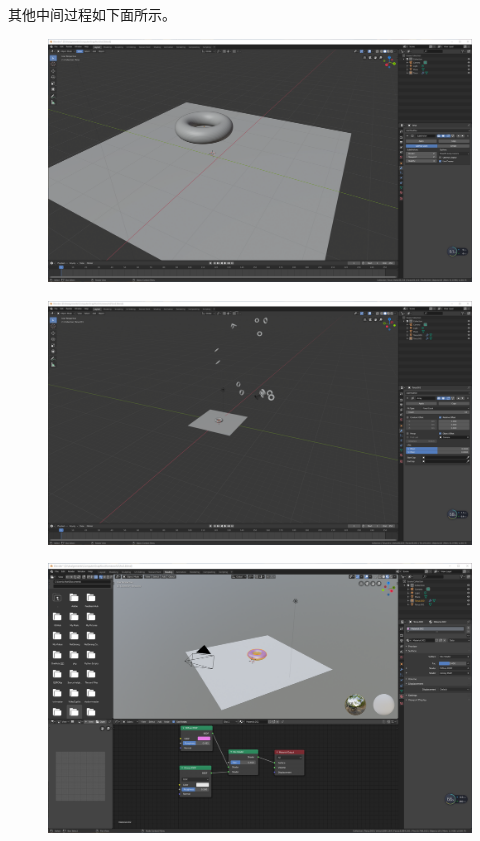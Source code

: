 \documentclass[logo,reportComp]{thesis}
\begin{document}
其他中间过程如下面所示。
\begin{figure}[H]
\centering
\includegraphics[width=\linewidth]{fig/v2.png}
\end{figure}
\begin{figure}[H]
\centering
\includegraphics[width=\linewidth]{fig/v3.png}
\end{figure}
\begin{figure}[H]
\centering
\includegraphics[width=\linewidth]{fig/v4.png}
\end{figure}
\end{document}
